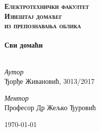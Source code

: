 
\begin{titlepage}

\begin{center}



\textsc{\Huge \textbf{Електротехнички факултет}}\\[5cm]

\textsc{\Huge \textbf{Извештај домаћег}}\\[0.5cm]
\textsc{\large{\textbf{из препознавања облика}}}
\\[4cm]

\HRule \\[0.8cm]
{ \Huge \bfseries Сви домаћи}\\[0.4cm]

\HRule \\[5cm]

\begin{minipage}{0.55\textwidth}
\begin{flushleft} \large
\emph{Аутор}\\
Ђорђе Живановић, 3013/2017\\
\end{flushleft}
\end{minipage}
\begin{minipage}{0.4\textwidth}
\begin{flushright} \large
\emph{Ментор} \\
Професор Др Жељко Ђуровић
\end{flushright}
\end{minipage}



\vfill

{\large \today}

\end{center}

\end{titlepage}
